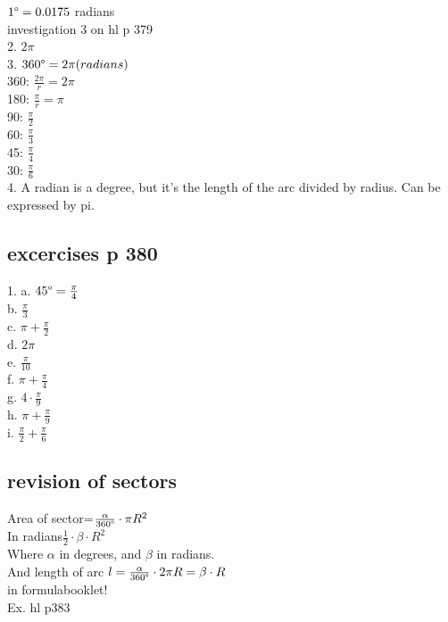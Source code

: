 \documentclass{article}
\begin{document}
  $1\degree=0.0175$ radians\\
  investigation 3 on hl p 379\\
  2. $2\pi$\\
  3. $360\degree=2\pi (radians)$\\
  360: $\frac{2\pi}{r}=2\pi$\\
  180: $\frac{\pi}{r}=\pi$\\
  90: $\frac{\pi}{2}$\\
  60: $\frac{\pi}{3}$\\
  45: $\frac{\pi}{4}$\\
  30: $\frac{\pi}{6}$\\
  4. A radian is a degree, but it's the length of the arc divided by radius. Can be expressed by pi.\\
  \subsection{excercises p 380}
  1. a. $45\degree=\frac{\pi}{4}$\\
  b. $\frac{\pi}{3}$\\
  c. $\pi+\frac{\pi}{2}$\\
  d. $2\pi$\\
  e. $\frac{\pi}{10}$\\
  f. $\pi+\frac{\pi}{4}$\\
  g. $4\cdot\frac{\pi}{9}$\\
  h. $\pi+\frac{\pi}{9}$\\
  i. $\frac{\pi}{2}+\frac{\pi}{6}$\\
  \subsection{revision of sectors}
  Area of sector=$\frac{\alpha}{360\degree}\cdot\pi R^2$\\
  In radians$\frac{1}{2}\cdot\beta\cdot R^2$\\
  Where $\alpha$ in degrees, and $\beta$ in radians.\\
  And length of arc $l=\frac{\alpha}{360\degree}\cdot2\pi R=\beta\cdot R$\\
  in formulabooklet!\\
  Ex. hl p383\\


   
\end{document}
